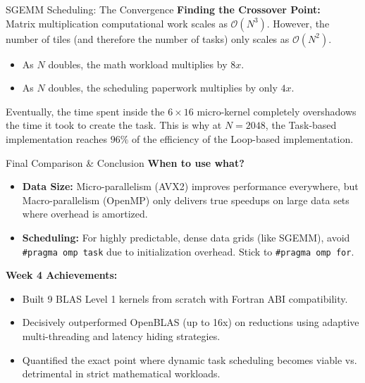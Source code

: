 \documentclass{beamer}
\begin{document}
\begin{frame}{SGEMM Scheduling: The Convergence}
    \textbf{Finding the Crossover Point:}\\
    Matrix multiplication computational work scales as $\mathcal{O}(N^3)$. However, the number of tiles (and therefore the number of tasks) only scales as $\mathcal{O}(N^2)$.
    
    \vspace{0.4cm}
    \begin{itemize}
        \item As $N$ doubles, the math workload multiplies by $8x$.
        \item As $N$ doubles, the scheduling paperwork multiplies by only $4x$.
    \end{itemize}
    \vspace{0.4cm}
    Eventually, the time spent inside the $6\times16$ micro-kernel completely overshadows the time it took to create the task. This is why at $N=2048$, the Task-based implementation reaches $96\%$ of the efficiency of the Loop-based implementation.
\end{frame}

\begin{frame}{Final Comparison \& Conclusion}
    \textbf{When to use what?}
    \begin{itemize}
        \item \textbf{Data Size:} Micro-parallelism (AVX2) improves performance everywhere, but Macro-parallelism (OpenMP) only delivers true speedups on large data sets where overhead is amortized.
        \item \textbf{Scheduling:} For highly predictable, dense data grids (like SGEMM), avoid \texttt{\#pragma omp task} due to initialization overhead. Stick to \texttt{\#pragma omp for}.
    \end{itemize}
    \vspace{0.4cm}
    \textbf{Week 4 Achievements:}
    \begin{itemize}
        \item Built 9 BLAS Level 1 kernels from scratch with Fortran ABI compatibility.
        \item Decisively outperformed OpenBLAS (up to 16x) on reductions using adaptive multi-threading and latency hiding strategies.
        \item Quantified the exact point where dynamic task scheduling becomes viable vs. detrimental in strict mathematical workloads.
    \end{itemize}
\end{frame}
\end{document}
